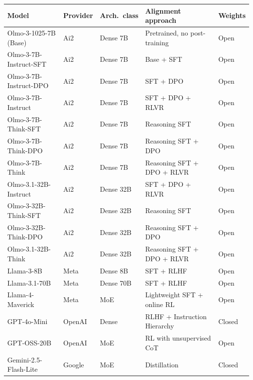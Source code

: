 \documentclass[11pt]{article}
\begin{document}
\begin{table}[H]
    \centering
    \footnotesize
    \setlength{\tabcolsep}{4pt}
    \renewcommand{\arraystretch}{1.0}
    \begin{tabular}{l l l l l}
        \toprule
        Model & Provider & Arch.\ class & Alignment approach & Weights \\
        \midrule
        Olmo-3-1025-7B (Base) & Ai2 & Dense 7B & Pretrained, no post-training \citep{olmo3} & Open \\
        Olmo-3-7B-Instruct-SFT & Ai2 & Dense 7B & Base + SFT \citep{olmo3} & Open \\
        Olmo-3-7B-Instruct-DPO & Ai2 & Dense 7B & SFT + DPO \citep{olmo3} & Open \\
        Olmo-3-7B-Instruct & Ai2 & Dense 7B & SFT + DPO + RLVR \citep{olmo3} & Open \\
        Olmo-3-7B-Think-SFT & Ai2 & Dense 7B & Reasoning SFT \citep{olmo3} & Open \\
        Olmo-3-7B-Think-DPO & Ai2 & Dense 7B & Reasoning SFT + DPO \citep{olmo3} & Open \\
        Olmo-3-7B-Think & Ai2 & Dense 7B & Reasoning SFT + DPO + RLVR \citep{olmo3} & Open \\
        Olmo-3.1-32B-Instruct & Ai2 & Dense 32B & SFT + DPO + RLVR \citep{olmo3} & Open \\
        Olmo-3-32B-Think-SFT & Ai2 & Dense 32B & Reasoning SFT \citep{olmo3} & Open \\
        Olmo-3-32B-Think-DPO & Ai2 & Dense 32B & Reasoning SFT + DPO \citep{olmo3} & Open \\
        Olmo-3.1-32B-Think & Ai2 & Dense 32B & Reasoning SFT + DPO + RLVR \citep{olmo3} & Open \\
        Llama-3-8B & Meta & Dense 8B & SFT + RLHF \citep{meta2024llama3} & Open \\
        Llama-3.1-70B & Meta & Dense 70B & SFT + RLHF \citep{meta2024llama3} & Open \\
        Llama-4-Maverick & Meta & MoE & Lightweight SFT + online RL \citep{meta2025llama4} & Open \\
        GPT-4o-Mini & OpenAI & Dense & RLHF + Instruction Hierarchy \citep{openai2024gpt4omini} & Closed \\
        GPT-OSS-20B & OpenAI & MoE & RL with unsupervised CoT \citep{openai2025gptoss} & Open \\
        Gemini-2.5-Flash-Lite & Google & MoE & Distillation \citep{google2025gemini25} & Closed \\

\end{tabular}
\end{table}
\end{document}
